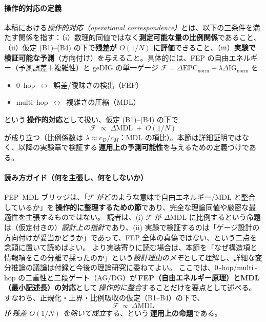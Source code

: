 \documentclass[ja=standard,xelatex]{bxjsarticle}
\newcommand{\F}{\mathcal{F}}
\newcommand{\gednorm}{\Delta\mathrm{EPC}_{\mathrm{norm}}}
\newcommand{\ignorm}{\Delta\mathrm{IG}_{\mathrm{norm}}}
\begin{document}
\paragraph{操作的対応の定義}\label{para:operational_correspondence}
本稿における\emph{操作的対応（operational correspondence）}とは、以下の三条件を満たす関係を指す：（i）数理的同値ではなく\textbf{測定可能な量の比例関係}であること、（ii）仮定 (B1)–(B4) の下で\textbf{残差が $O(1/N)$ に評価}できること、（iii）\textbf{実験で検証可能な予測}（方向付け）を与えること。具体的には、FEP の自由エネルギー（予測誤差＋複雑性）と geDIG の単一ゲージ $\F=\gednorm-\lambda\ignorm$ を
\begin{itemize}[leftmargin=1.2em]
  \item 0\,\mbox{-}hop \,$\leftrightarrow$\, 誤差/曖昧さの検出（FEP）
  \item multi\,\mbox{-}hop \,$\leftrightarrow$\, 複雑さの圧縮（MDL）
\end{itemize}
という\,\textbf{操作的対応}として扱い、仮定 (B1)–(B4) の下で
\begin{equation*}
  \F\;\propto\; \Delta\mathrm{MDL}\; +\; O(1/N)
\end{equation*}
が成り立つ（比例係数は $\lambda\approx c_{\!D}/c_{\!M}$：MDL の項比）。本節は詳細証明ではなく、以降の実験章で検証する\,\textbf{運用上の予測可能性}を与えるための定義づけである。

\paragraph{読み方ガイド（何を主張し、何をしないか）}
FEP–MDL ブリッジは、「$\F$ がどのような意味で自由エネルギー/MDL と整合しているか」を\,\textbf{操作的に整理するための節}であり、完全な理論同値や厳密な最適性を主張するものではない。
読者は、(i) $\F$ が $\Delta\mathrm{MDL}$ に比例するという命題は（仮定付きの）\emph{設計上の指針}であり、(ii) 実験で検証するのは「ゲージ設計の方向付けが妥当かどうか」であって、FEP 全体の真偽ではない、という二点を念頭に置いて読めばよい。
より実装寄りに読む場合は、本節を「なぜ構造項と情報項をこの分離で採ったのか」という\emph{設計理由のメモ}として理解し、詳細な変分推論の議論は付録と今後の理論研究に委ねてよい。
ここでは、0\,\mbox{-}hop/multi\,\mbox{-}hop の二重性と二段ゲート（AG/DG）が\,\textbf{FEP（自由エネルギー原理）とMDL（最小記述長）の対応}として\,\emph{操作的に整合}することだけを要点として述べる。すなわち、正規化・上界・比例吸収の仮定（B1–B4）の下で、
\[\;\F\ \propto\ \Delta\mathrm{MDL}\;\]
が\,\emph{残差 $O(1/N)$ を除いて成立}する、という\,\textbf{運用上の命題}である。
\end{document}
